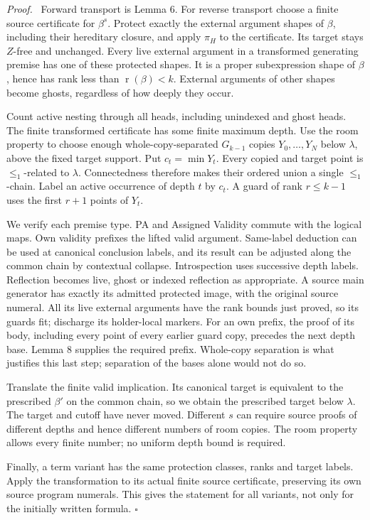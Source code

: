 \documentclass[11pt]{article}
\newcommand{\rk}{\operatorname{r}}
\newcommand{\qed}{\hfill\ensuremath{\square}}
\newenvironment{proof}{\par\emph{Proof.}\ }{\qed\par}
\begin{document}
\begin{proof}
Forward transport is Lemma 6. For reverse transport choose a finite
source certificate for $\beta^s$. Protect exactly the external argument
shapes of $\beta$, including their hereditary closure, and apply
$\pi_H$ to the certificate. Its target stays $Z$-free and unchanged.
Every live external argument in a transformed generating premise has
one of these protected shapes. It is a proper subexpression shape of
$\beta$, hence has rank less than $\rk(\beta)<k$. External arguments
of other shapes become ghosts, regardless of how deeply they occur.

Count active nesting through all heads, including unindexed and ghost
heads. The finite transformed certificate has some finite maximum depth.
Use the room property to choose enough whole-copy-separated
$G_{k-1}$ copies $Y_0,\ldots,Y_N$ below $\lambda$, above the fixed
target support. Put $c_t=\min Y_t$. Every copied and target point is
$\le_1$-related to $\lambda$. Connectedness therefore makes their
ordered union a single $\le_1$-chain. Label an active occurrence of
depth $t$ by $c_t$. A guard of rank $r\le k-1$ uses the first $r+1$
points of $Y_t$.

We verify each premise type. PA and Assigned Validity commute with the
logical maps. Own validity prefixes the lifted valid argument. Same-label
deduction can be used at canonical conclusion labels, and its result
can be adjusted along the common chain by contextual collapse.
Introspection uses successive depth labels. Reflection becomes live,
ghost or indexed reflection as appropriate. A source main generator
has exactly its admitted protected image, with the original source
numeral. All its live external arguments have the rank bounds just
proved, so its guards fit; discharge its holder-local markers. For an
own prefix, the proof of its body, including every point of every
earlier guard copy, precedes the next depth base. Lemma 8 supplies
the required prefix. Whole-copy separation is what justifies this last
step; separation of the bases alone would not do so.

Translate the finite valid implication. Its canonical target is
equivalent to the prescribed $\beta'$ on the common chain, so we
obtain the prescribed target below $\lambda$. The target and cutoff
have never moved. Different $s$ can require source proofs of different
depths and hence different numbers of room copies. The room property
allows every finite number; no uniform depth bound is required.

Finally, a term variant has the same protection classes, ranks and
target labels. Apply the transformation to its actual finite source
certificate, preserving its own source program numerals. This gives
the statement for all variants, not only for the initially written
formula.
\end{proof}
\end{document}
